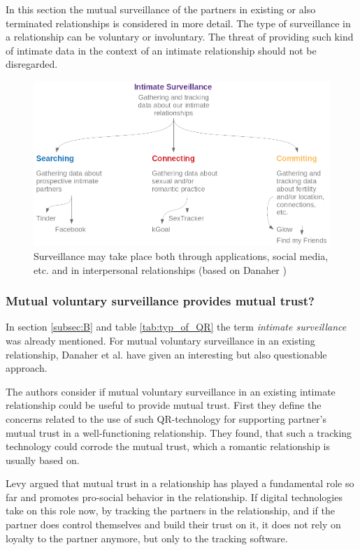 In this section the mutual surveillance of the partners in existing or also terminated relationships is considered in more detail. 
The type of surveillance in a relationship can be voluntary or involuntary. The threat of providing such kind of intimate data in the context of an intimate relationship should not be disregarded.
\begin{figure}[htb]
	\centering
	\includegraphics[width=\linewidth]{img/summarizing.png}
	\caption{Surveillance may take place both through applications, social media, etc. and in interpersonal relationships (based on Danaher \cite{ethicsOfSurveillance})}
	\label{fig:intimate_surveillance}
\end{figure}

\subsubsection{Mutual voluntary surveillance provides mutual trust?}
In section \ref{subsec:B} and table \ref{tab:typ_of_QR} the term \textit{intimate surveillance} was already mentioned.
For mutual voluntary surveillance in an existing relationship, Danaher et al. \cite{doi:10.1080/15265161.2017.1409823} have given an interesting but also questionable approach.

The authors consider if mutual voluntary surveillance in an existing intimate relationship could be useful to provide mutual trust.
First they define the concerns related to the use of such \acs{QR}-technology for supporting partner's mutual trust in a well-functioning relationship. They found, that such a tracking technology could corrode the mutual trust, which a romantic relationship is usually based on.

Levy \cite{levy2014intimate} argued that mutual trust in a relationship has played a fundamental role so far and promotes pro-social behavior in the relationship. If digital technologies take on this role now, by tracking the partners in the relationship, and if the partner does control themselves and build their trust on it, it does not rely on loyalty to the partner anymore, but only to the tracking software.

